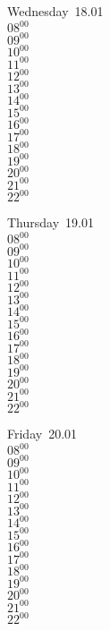 \documentclass[11pt,a4paper]{book}\usepackage[]{graphicx}\usepackage[]{color}
\begin{document}
\begin{weekdaybox}
  Wednesday~18.01\\
  { 
  \vfill
  $08^{00}$\\
$09^{00}$\\
$10^{00}$\\
$11^{00}$\\
$12^{00}$\\
$13^{00}$\\
$14^{00}$\\
$15^{00}$\\
$16^{00}$\\
$17^{00}$\\
$18^{00}$\\
$19^{00}$\\
$20^{00}$\\
$21^{00}$\\
$22^{00}$\\
  }
\end{weekdaybox}
\clearpage
\begin{headerbox}
\end{headerbox}
\begin{weekdaybox}
  Thursday~19.01\\
  { 
  \vfill
  $08^{00}$\\
$09^{00}$\\
$10^{00}$\\
$11^{00}$\\
$12^{00}$\\
$13^{00}$\\
$14^{00}$\\
$15^{00}$\\
$16^{00}$\\
$17^{00}$\\
$18^{00}$\\
$19^{00}$\\
$20^{00}$\\
$21^{00}$\\
$22^{00}$\\
  }
\end{weekdaybox} 
\begin{weekdaybox}
  Friday~20.01\\
  { 
  \vfill
  $08^{00}$\\
$09^{00}$\\
$10^{00}$\\
$11^{00}$\\
$12^{00}$\\
$13^{00}$\\
$14^{00}$\\
$15^{00}$\\
$16^{00}$\\
$17^{00}$\\
$18^{00}$\\
$19^{00}$\\
$20^{00}$\\
$21^{00}$\\
$22^{00}$\\
  }
\end{weekdaybox}
\end{document}
